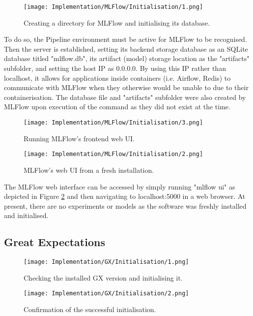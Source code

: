 \begin{figure}[H]
    \centering
    \texttt{[image: Implementation/MLFlow/Initialisation/1.png]}
    \caption{Creating a directory for MLFlow and initialising its database.}
    \label{fig:MLFlowInit}
\end{figure}

\para To do so, the Pipeline environment must be active for MLFlow to be recognised. Then the server 
is established, setting its backend storage database as an SQLite database titled "mlflow.db",
its artifact (model) storage location as the "artifacts" subfolder, and setting the host IP as 0.0.0.0. By using 
this IP rather than localhost, it allows for applications inside containers (i.e. Airflow, Redis) to communicate 
with MLFlow when they otherwise would be unable to due to their containerisation. The database file and "artifacts"
subfolder were also created by MLFlow upon execution of the command as they did not exist at the time. 

\begin{figure}[H]
    \centering
    \texttt{[image: Implementation/MLFlow/Initialisation/3.png]}
    \caption{Running MLFlow's frontend web UI.}
    \label{fig:MLFlowUICmd}
\end{figure}

\begin{figure}[H]
    \centering
    \texttt{[image: Implementation/MLFlow/Initialisation/2.png]}
    \caption{MLFlow's web UI from a fresh installation.}
    \label{fig:MLFlowEmptyUI}
\end{figure}

\para The MLFlow web interface can be accessed by simply running "mlflow ui" as depicted in Figure \ref{fig:MLFlowUICmd}
and then navigating to localhost:5000 in a web browser. At present, there are no experiments or models as the software 
was freshly installed and initialised.

\subsection{Great Expectations}

\begin{figure}[H]
    \centering
    \texttt{[image: Implementation/GX/Initialisation/1.png]}
    \caption{Checking the installed GX version and initialising it.}
    \label{fig:GXVersion}
\end{figure}

\begin{figure}[H]
    \centering
    \texttt{[image: Implementation/GX/Initialisation/2.png]}
    \caption{Confirmation of the successful initialisation.}
    \label{fig:GXInitConfirm}
\end{figure}

